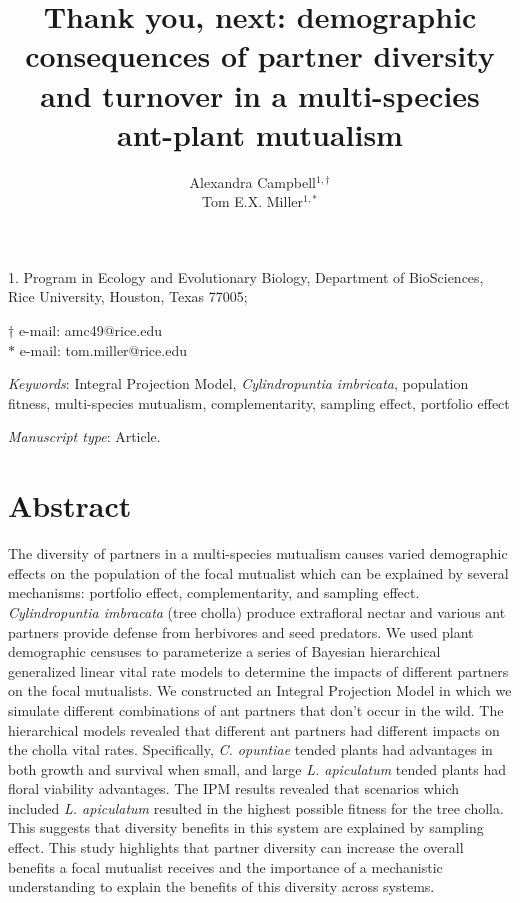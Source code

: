 \documentclass[11pt]{article}
\title{Thank you, next: demographic consequences of partner diversity and turnover in a multi-species ant-plant mutualism}
\author{Alexandra Campbell$^{1,\dagger}$ \\ 
	Tom E.X. Miller$^{1,\ast}$}
\date{}
\begin{document}
	
	\maketitle
	
	\noindent{} 1. Program in Ecology and Evolutionary Biology, Department of BioSciences, Rice University, Houston, Texas 77005;
	
	\noindent{} $\dagger$ e-mail: amc49@rice.edu\\
	\noindent{} $\ast$ e-mail: tom.miller@rice.edu
	
	\bigskip
	
	\textit{Keywords}:  Integral Projection Model, \textit{Cylindropuntia imbricata}, population fitness, multi-species mutualism, complementarity, sampling effect, portfolio effect
	
	\bigskip
	
	\textit{Manuscript type}: Article.
	
	\bigskip
	
	
\linenumbers{}
\modulolinenumbers[3]

\newpage{}

	\section*{Abstract}
The diversity of partners in a multi-species mutualism causes varied demographic effects on the population of the focal mutualist which can be explained by several mechanisms: portfolio effect, complementarity, and sampling effect.
\textit{Cylindropuntia imbracata} (tree cholla) produce extrafloral nectar and various ant partners provide defense from herbivores and seed predators. 
We used plant demographic censuses to parameterize a series of Bayesian hierarchical generalized linear vital rate models to determine the impacts of different partners on the focal mutualists. 
We constructed an Integral Projection Model in which we simulate different combinations of ant partners that don’t occur in the wild.
The hierarchical models revealed that different ant partners had different impacts on the cholla vital rates. 
Specifically, \textit{C. opuntiae} tended plants had advantages in both growth and survival when small, and large \textit{L. apiculatum} tended plants had floral viability advantages. 
The IPM results revealed that scenarios which included \textit{L. apiculatum} resulted in the highest possible fitness for the tree cholla. 
This suggests that diversity benefits in this system are explained by sampling effect.
This study highlights that partner diversity can increase the overall benefits a focal mutualist receives and the importance of a mechanistic understanding to explain the benefits of this diversity across systems.
\end{document}

